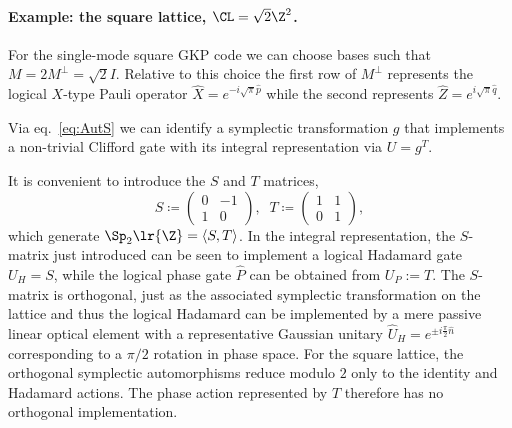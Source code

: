 \documentclass[a4paper, aps, pra, 11pt, onecolumn, tightenlines, superscriptaddress]{revtex4-2}
\begin{document}
\medskip
\paragraph*{Example: the square lattice, $\CL=\sqrt{2}\Z^2$.}
For the single-mode square GKP code we can choose bases such that $M=2M^{\perp}=\sqrt{2}I$. 
Relative to this choice the first row of $M^{\perp}$ represents the logical $X$-type Pauli operator 
$\hat{X}=e^{-i\sqrt{\pi}\hat{p}}$ while the second represents $\hat{Z}=e^{i\sqrt{\pi}\hat{q}}$. 

Via eq.~\eqref{eq:AutS} we can identify a symplectic transformation $g$ that implements a non-trivial Clifford gate with its integral representation via  $U=g^T$.

It is convenient to introduce the $S$ and $T$ matrices,
\begin{equation}
    S\coloneqq\begin{pmatrix}
        0 & -1 \\ 1 & 0
    \end{pmatrix},\;\;
    T\coloneqq\begin{pmatrix}
        1 & 1 \\ 0 & 1
    \end{pmatrix},\label{eq:ST}
\end{equation}
which generate $\Sp_2\lr{\Z}=\langle S, T \rangle$.
%
In the integral representation, the $S$-matrix just introduced can be seen to implement a logical Hadamard gate $U_H=S$, while the logical phase gate $\hat{P}$ can be obtained from $U_P:= T$.
The $S$-matrix is orthogonal, just as the associated symplectic transformation on the lattice and thus the logical Hadamard can be implemented by a mere passive linear optical element with a representative Gaussian unitary $\hat{U}_H=e^{\pm i\frac{\pi}{2}\hat{n}}$ corresponding to a $\pi/2$ rotation in phase space. 
For the square lattice, the orthogonal symplectic automorphisms reduce modulo $2$ only to the identity and Hadamard actions. The phase action represented by $T$ therefore has no orthogonal implementation.

\medskip
\end{document}
